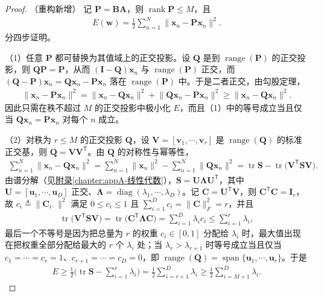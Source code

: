 \documentclass[../../main.tex]{subfiles}
\begin{document}
\begin{proof}（重构新增）
记 $\bm{P}=\bm{B}\bm{A}$，则 $\operatorname{rank}\bm{P}\leqslant M$，且
\begin{align*}
E(\bm{w})=\frac{1}{2}\sum_{n=1}^{N}\big\|\bm{x}_n-\bm{P}\bm{x}_n\big\|^{2}.
\end{align*}
分四步证明。

（1）任意 $\bm{P}$ 都可替换为其值域上的正交投影。设 $\bm{Q}$ 是到 $\operatorname{range}(\bm{P})$ 的正交投影，则 $\bm{Q}\bm{P}=\bm{P}$，从而 $(\bm{I}-\bm{Q})\bm{x}_n$ 与 $\operatorname{range}(\bm{P})$ 正交，而 $(\bm{Q}-\bm{P})\bm{x}_n=\bm{Q}\bm{x}_n-\bm{P}\bm{x}_n$ 落在 $\operatorname{range}(\bm{P})$ 中。于是二者正交，由勾股定理，
\begin{align*}
\big\|\bm{x}_n-\bm{P}\bm{x}_n\big\|^{2}=\big\|\bm{x}_n-\bm{Q}\bm{x}_n\big\|^{2}+\big\|\bm{Q}\bm{x}_n-\bm{P}\bm{x}_n\big\|^{2}\geqslant\big\|\bm{x}_n-\bm{Q}\bm{x}_n\big\|^{2}.
\end{align*}
因此只需在秩不超过 $M$ 的正交投影中极小化 $E$，而且（1）中的等号成立当且仅当 $\bm{Q}\bm{x}_n=\bm{P}\bm{x}_n$ 对每个 $n$ 成立。

（2）对秩为 $r\leqslant M$ 的正交投影 $\bm{Q}$，设 $\bm{V}=[\bm{v}_1,\cdots,\bm{v}_r]$ 是 $\operatorname{range}(\bm{Q})$ 的标准正交基，则 $\bm{Q}=\bm{V}\bm{V}^{\mathsf T}$。由 $\bm{Q}$ 的对称性与幂等性，
\begin{align*}
\sum_{n=1}^{N}\big\|\bm{x}_n-\bm{Q}\bm{x}_n\big\|^{2}=\sum_{n=1}^{N}\|\bm{x}_n\|^{2}-\sum_{n=1}^{N}\|\bm{Q}\bm{x}_n\|^{2}=\operatorname{tr}\bm{S}-\operatorname{tr}\big(\bm{V}^{\mathsf T}\bm{S}\bm{V}\big).
\end{align*}
由谱分解（见\hyperref[chapter:appA-线性代数]{附录\ref*{chapter:appA-线性代数}}），$\bm{S}=\bm{U}\bm{\Lambda}\bm{U}^{\mathsf T}$，其中 $\bm{U}=[\bm{u}_1,\cdots,\bm{u}_D]$ 正交、$\bm{\Lambda}=\operatorname{diag}(\lambda_1,\cdots,\lambda_D)$。记 $\bm{C}=\bm{U}^{\mathsf T}\bm{V}$，则 $\bm{C}^{\mathsf T}\bm{C}=\bm{I}_r$，故 $c_i\triangleq\|\bm{C}_{i\cdot}\|^{2}$ 满足 $0\leqslant c_i\leqslant1$ 且 $\sum_{i=1}^{D}c_i=\|\bm{C}\|_F^{2}=r$，并且
\begin{align*}
\operatorname{tr}\big(\bm{V}^{\mathsf T}\bm{S}\bm{V}\big)=\operatorname{tr}\big(\bm{C}^{\mathsf T}\bm{\Lambda}\bm{C}\big)=\sum_{i=1}^{D}\lambda_i c_i\leqslant\sum_{i=1}^{r}\lambda_i,
\end{align*}
最后一个不等号是因为把总量为 $r$ 的权重 $c_i\in[0,1]$ 分配给 $\lambda_i$ 时，最大值出现在把权重全部分配给最大的 $r$ 个 $\lambda_i$ 处；当 $\lambda_r>\lambda_{r+1}$ 时等号成立当且仅当 $c_1=\cdots=c_r=1$、$c_{r+1}=\cdots=c_D=0$，即 $\operatorname{range}(\bm{Q})=\operatorname{span}\{\bm{u}_1,\cdots,\bm{u}_r\}$。于是
\begin{align*}
E\geqslant\frac{1}{2}\Big(\operatorname{tr}\bm{S}-\sum_{i=1}^{r}\lambda_i\Big)=\frac{1}{2}\sum_{i=r+1}^{D}\lambda_i\geqslant\frac{1}{2}\sum_{i=M+1}^{D}\lambda_i.
\end{align*}


\end{proof}
\end{document}
